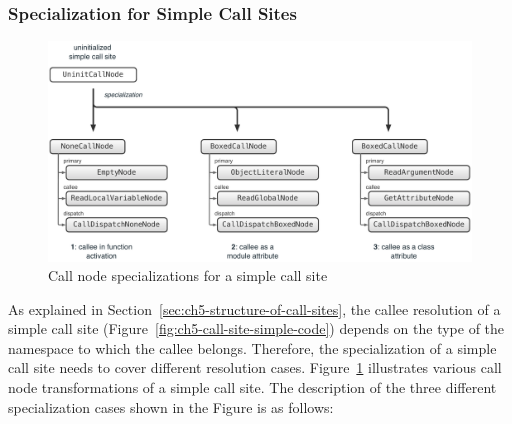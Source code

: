 \subsubsection{Specialization for Simple Call Sites}

\begin{figure}
\centering
\includegraphics[scale=.5]{figures/ch5-call-node-specialization-simple}
\caption{Call node specializations for a simple call site}
\label{fig:ch5-call-node-specialization-simple}
\end{figure}

As explained in Section~\ref{sec:ch5-structure-of-call-sites}, the callee resolution of a simple call site (Figure~\ref{fig:ch5-call-site-simple-code}) depends on the type of the namespace to which the callee belongs.
Therefore, the specialization of a simple call site needs to cover different resolution cases.
Figure~\ref{fig:ch5-call-node-specialization-simple} illustrates various call node transformations of a simple call site.
The description of the three different specialization cases shown in the Figure is as follows:

